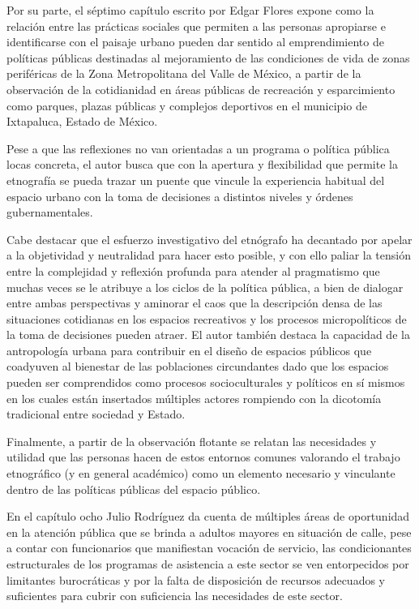\documentclass[
  spanish,
  11pt,
  a4paper,
]{scrbook}
\begin{document}
\vspace*{.75cm}

Por su parte, el séptimo capítulo escrito por Edgar Flores expone como
la relación entre las prácticas sociales que permiten a las personas
apropiarse e identificarse con el paisaje urbano pueden dar sentido al
emprendimiento de políticas públicas destinadas al mejoramiento de las
condiciones de vida de zonas periféricas de la Zona Metropolitana del
Valle de México, a partir de la observación de la cotidianidad en áreas
públicas de recreación y esparcimiento como parques, plazas públicas y
complejos deportivos en el municipio de Ixtapaluca, Estado de México.

Pese a que las reflexiones no van orientadas a un programa o política
pública locas concreta, el autor busca que con la apertura y
flexibilidad que permite la etnografía se pueda trazar un puente que
vincule la experiencia habitual del espacio urbano con la toma de
decisiones a distintos niveles y órdenes gubernamentales.

Cabe destacar que el esfuerzo investigativo del etnógrafo ha decantado
por apelar a la objetividad y neutralidad para hacer esto posible, y con
ello paliar la tensión entre la complejidad y reflexión profunda para
atender al pragmatismo que muchas veces se le atribuye a los ciclos de
la política pública, a bien de dialogar entre ambas perspectivas y
aminorar el caos que la descripción densa de las situaciones cotidianas
en los espacios recreativos y los procesos micropolíticos de la toma de
decisiones pueden atraer. El autor también destaca la capacidad de la
antropología urbana para contribuir en el diseño de espacios públicos
que coadyuven al bienestar de las poblaciones circundantes dado que los
espacios pueden ser comprendidos como procesos socioculturales y
políticos en sí mismos en los cuales están insertados múltiples actores
rompiendo con la dicotomía tradicional entre sociedad y Estado.

Finalmente, a partir de la observación flotante se relatan las
necesidades y utilidad que las personas hacen de estos entornos comunes
valorando el trabajo etnográfico (y en general académico) como un
elemento necesario y vinculante dentro de las políticas públicas del
espacio público.

\vspace*{.75cm}

En el capítulo ocho Julio Rodríguez da cuenta de múltiples áreas de
oportunidad en la atención pública que se brinda a adultos mayores en
situación de calle, pese a contar con funcionarios que manifiestan
vocación de servicio, las condicionantes estructurales de los programas
de asistencia a este sector se ven entorpecidos por limitantes
burocráticas y por la falta de disposición de recursos adecuados y
suficientes para cubrir con suficiencia las necesidades de este sector.
\end{document}
